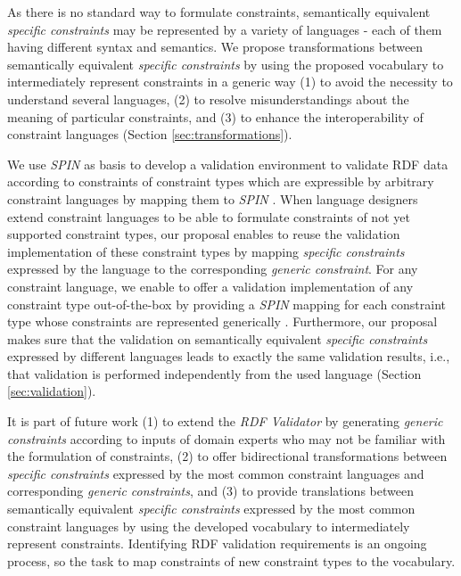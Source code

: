 \documentclass[a4paper,fontsize=11pt]{scrartcl}
\begin{document}
As there is no standard way to formulate constraints, 
semantically equivalent \emph{specific constraints} may be represented by a variety of languages - each of them having different syntax and semantics.
We propose transformations between semantically equivalent \emph{specific constraints}
by using the proposed vocabulary to intermediately represent constraints in a generic way
(1) to avoid the necessity to understand several languages,
(2) to resolve misunderstandings about the meaning of particular constraints, and
(3) to enhance the interoperability of constraint languages (Section \ref{sec:transformations}).

We use \emph{SPIN} as basis to develop a validation environment to validate RDF data according to constraints of constraint types which are expressible by arbitrary constraint languages by mapping them to \emph{SPIN} \cite{BoschEckert2014-2}.
When language designers extend constraint languages 
to be able to formulate constraints of not yet supported constraint types,
our proposal enables to reuse the validation implementation of these constraint types 
by mapping \emph{specific constraints} expressed by the language to the corresponding \emph{generic constraint}.
For any constraint language, we enable to offer a validation implementation of any constraint type out-of-the-box
by providing a \emph{SPIN} mapping
for each constraint type  
whose constraints are represented generically \cite{BoschEckert2015-2}. 
Furthermore, our proposal makes sure that the validation on semantically equivalent \emph{specific constraints} expressed by different languages
leads to exactly the same validation results, 
i.e., that validation is performed independently from the used language (Section \ref{sec:validation}).

It is part of future work 
(1) to extend the \emph{RDF Validator} by generating \emph{generic constraints} according to inputs of domain experts who may not be familiar with the formulation of constraints,
(2) to offer bidirectional transformations between \emph{specific constraints} expressed by the most common constraint languages and corresponding \emph{generic constraints}, and
(3) to provide translations between semantically equivalent \emph{specific constraints} expressed by the most common constraint languages by using the developed vocabulary to intermediately represent constraints.
Identifying RDF validation requirements is an ongoing process,
so the task to map constraints of new constraint types to the vocabulary.
\end{document}
